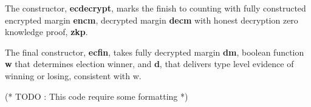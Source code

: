 \documentclass{llncs}
\begin{document}
 
   
   
   


The constructor, \textbf{ecdecrypt}, marks the finish to counting with 
fully constructed encrypted margin \textbf{encm}, 
decrypted margin \textbf{decm} with honest decryption zero knowledge proof, 
\textbf{zkp}.

The final constructor, \textbf{ecfin}, takes fully decrypted margin 
\textbf{dm}, boolean function \textbf{w} that determines election winner, 
and \textbf{d}, that delivers type level evidence of winning or losing, 
consistent with w. \linebreak



(* TODO : This code require some formatting *)

\end{document}
